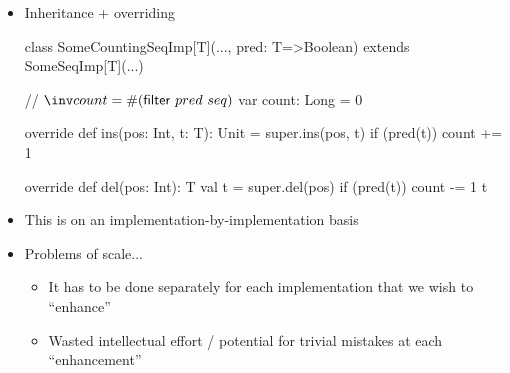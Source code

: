 \documentclass{ip3}
\begin{document}
\begin{foil}
\begin{itemize}
        \item  Inheritance + overriding 
        \begin{-scala}
        
           class SomeCountingSeqImp[T](..., pred: T=>Boolean) extends SomeSeqImp[T](...) { 
              // $\inv count = \# (\mathsf{filter}~pred~seq)$
              var count: Long = 0
              
              override def ins(pos: Int, t: T): Unit =
              { super.ins(pos, t)
                if (pred(t)) count += 1
              }
              
              override def del(pos: Int): T
              { val t = super.del(pos)
                if (pred(t)) count -= 1
                t
              }              
           }         
        \end{-scala}
        
        \item This is on an implementation-by-implementation basis 
        \item Problems of scale...
        \begin{itemize}
                \item It has to be done separately for each implementation that we wish to ``enhance''
                \item Wasted intellectual effort /  potential for trivial mistakes at each ``enhancement''        
        \end{itemize}

\end{itemize} 
\end{foil}
\end{document}
